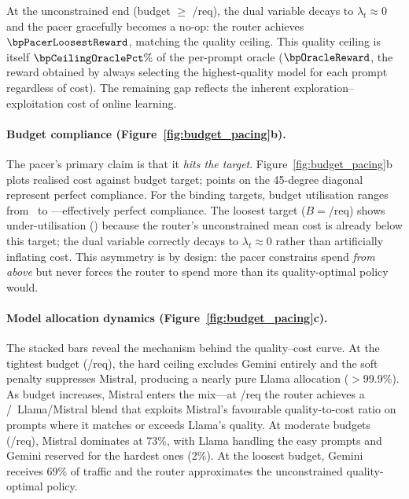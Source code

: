 At the unconstrained end (budget $\geq$ \bpExpensiveModelCost/req),
the dual variable decays to $\lambda_t \approx 0$ and the pacer
gracefully becomes a no-op: the router achieves
$\bpPacerLoosestReward$, matching the quality ceiling.
This quality ceiling is itself $\bpCeilingOraclePct\%$ of the per-prompt oracle
($\bpOracleReward$, the reward obtained by always selecting the
highest-quality model for each prompt regardless of cost).
The remaining gap reflects the inherent exploration--exploitation
cost of online learning.

\paragraph{Budget compliance
(Figure~\ref{fig:budget_pacing}b).}
The pacer's primary claim is that it \emph{hits the target}.
Figure~\ref{fig:budget_pacing}b plots realised cost against
budget target; points on the 45-degree diagonal represent
perfect compliance.
For the binding targets, budget utilisation ranges from
\bpUtilBindingLow\ to \bpUtilBindingHigh---effectively
perfect compliance.
The loosest target ($B{=}$\bpExpensiveModelCost/req) shows
under-utilisation (\bpLoosestUtil) because the
router's unconstrained mean cost is already below
this target; the dual variable correctly decays to
$\lambda_t \approx 0$ rather than artificially inflating cost.
This asymmetry is by design: the pacer constrains spend
\emph{from above} but never forces the router to spend more than its
quality-optimal policy would.

\paragraph{Model allocation dynamics
(Figure~\ref{fig:budget_pacing}c).}
The stacked bars reveal the mechanism behind the quality--cost curve.
At the tightest budget (\bpCheapestModelCost/req), the hard ceiling
excludes Gemini entirely and the soft penalty suppresses Mistral,
producing a nearly pure Llama allocation ($>$99.9\%).
As budget increases, Mistral enters the mix---at
\bpAnnotBudget/req the router achieves a \bpAnnotLlamaFrac/\bpAnnotMistralFrac\
Llama/Mistral blend that exploits Mistral's favourable
quality-to-cost ratio on prompts where it matches or exceeds
Llama's quality.
At moderate budgets (\bpPacerFourthCost/req), Mistral dominates
at 73\%, with Llama handling the easy prompts and Gemini reserved
for the hardest ones (2\%).
At the loosest budget, Gemini receives 69\% of traffic and the
router approximates the unconstrained quality-optimal policy.

